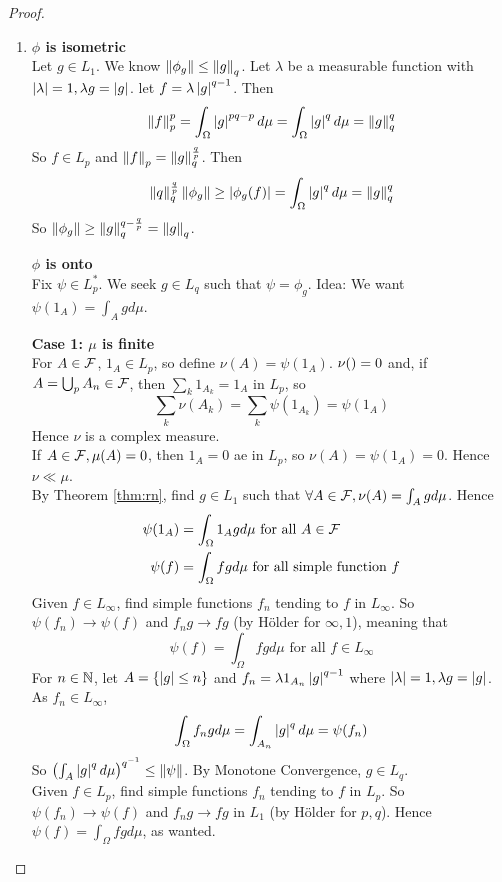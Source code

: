 \documentclass{article}
\begin{document}
\begin{proof}~
  \begin{enumerate}
    \item {\bf $\phi$ is isometric} \\
    Let $g \in L_1$. We know $\left\lVert \phi_g\right\rVert \le \left\lVert g\right\rVert_q$. Let $\lambda$ be a measurable function with $\left\lvert \lambda\right\rvert = 1, \lambda g = \left\lvert g\right\rvert$. let $f = \lambda\left\lvert g\right\rvert^{q - 1}$. Then
    $$\left\lVert f\right\rVert_p^p = \int_\Omega \left\lvert g\right\rvert^{pq - p} d\mu = \int_\Omega \left\lvert g\right\rvert^q d\mu = \left\lVert g\right\rVert_q^q$$
    So $f \in L_p$ and $\left\lVert f\right\rVert_p = \left\lVert g\right\rVert_q^{\frac qp}$. Then
    $$\left\lVert q\right\rVert_q^{\frac qp}\left\lVert \phi_g\right\rVert \ge \left\lvert \phi_g(f)\right\rvert = \int_\Omega \left\lvert g\right\rvert^q d\mu = \left\lVert g\right\rVert_q^q$$
    So $\left\lVert \phi_g\right\rVert \ge \left\lVert g\right\rVert_q^{q - \frac qp} = \left\lVert g\right\rVert_q$.

    {\bf $\phi$ is onto} \\
    Fix $\psi \in L_p^*$. We seek $g \in L_q$ such that $\psi = \phi_g$. Idea: We want $\psi(1_A) = \int_A g d\mu$.

    {\bf Case 1: $\mu$ is finite} \\
    For $A \in \mathcal F$, $1_A \in L_p$, so define $\nu(A) = \psi(1_A)$. $\nu(\empty) = 0$ and, if $A = \bigcup_p A_n \in \mathcal F$, then $\sum_k 1_{A_k} = 1_A$ in $L_p$, so
    $$\sum_k \nu(A_k) = \sum_k \psi(1_{A_k}) = \psi(1_A)$$
    Hence $\nu$ is a complex measure. \\
    If $A \in \mathcal F, \mu(A) = 0$, then $1_A = 0$ ae in $L_p$, so $\nu(A) = \psi(1_A) = 0$. Hence $\nu \ll \mu$. \\
    By Theorem \ref{thm:rn}, find $g \in L_1$ such that $\forall A \in \mathcal F, \nu(A) = \int_A g d\mu$. Hence
    \begin{align*}
      \psi(1_A) & = \int_\Omega 1_A g d\mu \text{ for all } A \in \mathcal F \\
      \psi(f) & = \int_\Omega fg d\mu \text{ for all simple function } f
    \end{align*}
    Given $f \in L_\infty$, find simple functions $f_n$ tending to $f$ in $L_\infty$. So $\psi(f_n) \to \psi(f)$ and $f_ng \to fg$ (by Hölder for $\infty, 1$), meaning that
    $$\psi(f) = \int_\Omega fg d\mu \text{ for all } f \in L_\infty$$
    For $n \in \mathbb N$, let $A = \{\left\lvert g\right\rvert \le n\}$ and $f_n = \lambda 1_{A_n} \left\lvert g\right\rvert^{q - 1}$ where $\left\lvert \lambda\right\rvert = 1, \lambda g = \left\lvert g\right\rvert$. As $f_n \in L_\infty$,
    $$\int_\Omega f_ng d\mu = \int_{A_n} \left\lvert g\right\rvert^q d\mu = \psi(f_n)$$
    So $\left(\int_A \left\lvert g\right\rvert^q d\mu\right)^{q^{-1}} \le \left\lVert \psi\right\rVert$. By Monotone Convergence, $g \in L_q$. \\
    Given $f \in L_p$, find simple functions $f_n$ tending to $f$ in $L_p$. So $\psi(f_n) \to \psi(f)$ and $f_ng \to fg$ in $L_1$ (by Hölder for $p, q$). Hence $\psi(f) = \int_\Omega fg d\mu$, as wanted.


\end{enumerate}
\end{proof}
\end{document}
